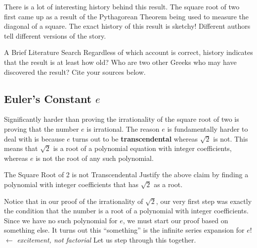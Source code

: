 There is a lot of interesting history behind this result.  The square root of two first came up as a result of the Pythagorean Theorem being used to measure the diagonal of a square.  The exact history of this result is sketchy!  Different authors tell different versions of the story.

\begin{exercise}{A Brief Literature Search \Coffeecup \Coffeecup}
Regardless of which account is correct, history indicates that the result is at least how old?  Who are two other Greeks who may have discovered the result?
Cite your sources below.
\vspace{1in}
\end{exercise}

\subsection{Euler's Constant $e$}

Significantly harder than proving the irrationality of the square root of two is proving that the number $e$ is irrational.  The reason $e$ is fundamentally harder to deal with is because $e$ turns out to be {\bf transcendental } whereas $\sqrt{2}$ is not.  This means that $\sqrt{2}$ is a root of a polynomial equation with integer coefficients, whereas $e$ is not the root of any such polynomial. 

\begin{exercise}{The Square Root of 2 is not Transcendental  \Coffeecup}
Justify the above claim by finding a polynomial with integer coefficients that has $\sqrt{2}$ as a root.

\vspace*{1in}
\end{exercise}

Notice that in our proof of the irrationality of $\sqrt{2}$, our very first step was exactly the condition that the number is a root of a polynomial with integer coefficients.  Since we have no such polynomial for $e$, we must start our proof based on something else.  It turns out this ``something'' is the infinite series expansion for $e!$ $\leftarrow$ {\small{\emph{excitement, not factorial}}}  Let us step through this together.  

